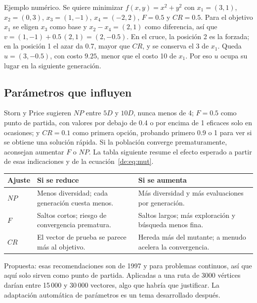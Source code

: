 Ejemplo numérico. Se quiere minimizar $f(x,y)=x^2+y^2$ con $x_1=(3,1)$, $x_2=(0,3)$, $x_3=(1,-1)$, $x_4=(-2,2)$, $F=0.5$ y $CR=0.5$. Para el objetivo $x_1$ se eligen $x_3$ como base y $x_2-x_4=(2,1)$ como diferencia, así que $v=(1,-1)+0.5\,(2,1)=(2,-0.5)$. En el cruce, la posición 2 es la forzada; en la posición 1 el azar da 0.7, mayor que $CR$, y se conserva el 3 de $x_1$. Queda $u=(3,-0.5)$, con costo $9.25$, menor que el costo 10 de $x_1$. Por eso $u$ ocupa su lugar en la siguiente generación.

\subsection{Parámetros que influyen}
Storn y Price sugieren $NP$ entre $5D$ y $10D$, nunca menos de 4; $F=0.5$ como punto de partida, con valores por debajo de 0.4 o por encima de 1 eficaces solo en ocasiones; y $CR=0.1$ como primera opción, probando primero 0.9 o 1 para ver si se obtiene una solución rápida. Si la población converge prematuramente, aconsejan aumentar $F$ o $NP$.\cite{de10} La tabla siguiente resume el efecto esperado a partir de esas indicaciones y de la ecuación~\eqref{de:eq:mut}.

\begin{center}

\begin{adjustbox}{max width=\linewidth}
\begin{tabular}{@{}P{1.5cm}P{7.1cm}P{7.1cm}@{}}
\toprule
Ajuste & Si se reduce & Si se aumenta\\
\midrule
$NP$ & Menos diversidad; cada generación cuesta menos. & Más diversidad y más evaluaciones por generación.\\
$F$ & Saltos cortos; riesgo de convergencia prematura. & Saltos largos; más exploración y búsqueda menos fina.\\
$CR$ & El vector de prueba se parece más al objetivo. & Hereda más del mutante; a menudo acelera la convergencia.\\
\bottomrule
\end{tabular}
\end{adjustbox}
\end{center}

Propuesta: esas recomendaciones son de 1997 y para problemas continuos, así que aquí solo sirven como punto de partida. Aplicadas a una ruta de 3000 vértices darían entre 15\,000 y 30\,000 vectores, algo que habría que justificar. La adaptación automática de parámetros es un tema desarrollado después.\cite{de11}

